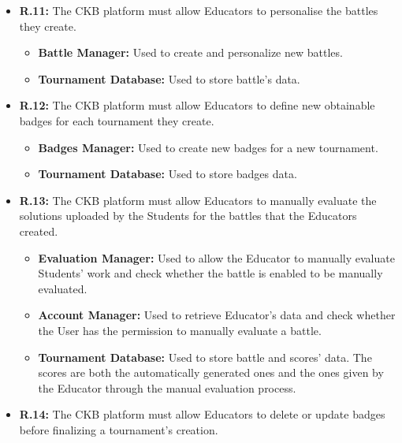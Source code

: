 \documentclass{article}
\begin{document}
{\begin{itemize}
          \begin{itemize}
              \item \textbf{Tournament Manager:} Used to create and personalize new tournaments.
              \item \textbf{Tournament Database:} Used to store tournament's data.
          \end{itemize}
    \item \textbf{R.11:} The CKB platform must allow Educators to personalise the battles they create.
          \begin{itemize}
              \item \textbf{Battle Manager:} Used to create and personalize new battles.
              \item \textbf{Tournament Database:} Used to store battle's data.
          \end{itemize}
    \item \textbf{R.12:} The CKB platform must allow Educators to define new obtainable badges for each tournament they
          create.
          \begin{itemize}
              \item \textbf{Badges Manager:} Used to create new badges for a new tournament.
              \item \textbf{Tournament Database:} Used to store badges data.
          \end{itemize}
    \item \textbf{R.13:} The CKB platform must allow Educators to manually evaluate the solutions uploaded by the Students for the battles that
          the Educators created.
          \begin{itemize}
              \item \textbf{Evaluation Manager:} Used to allow the Educator to manually evaluate Students'
              work and check whether the battle is enabled to be manually evaluated.
              \item \textbf{Account Manager:} Used to retrieve Educator's data and check whether
              the User has the permission to manually evaluate a battle.
              \item \textbf{Tournament Database:} Used to store battle and scores' data. The scores are both the automatically generated ones and the ones
              given by the Educator through the manual evaluation process.  
          \end{itemize}
    \item \textbf{R.14:} The CKB platform must allow Educators to delete or update badges before finalizing a tournament's creation.

\end{itemize}}
\end{document}
